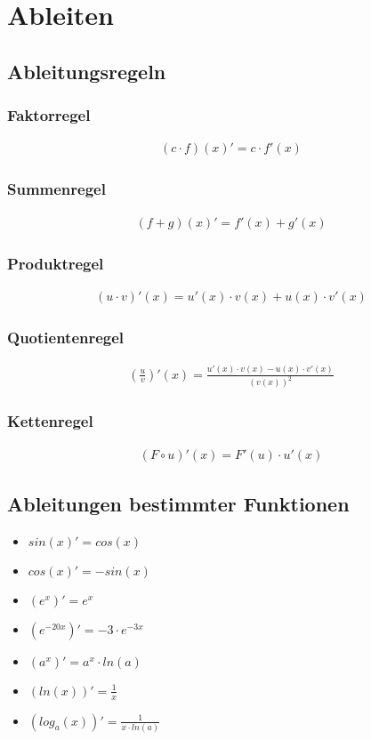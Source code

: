 \section{Ableiten}
\subsection{Ableitungsregeln}
\subsubsection{Faktorregel}
\begin{align*}
    (c \cdot f)(x)' = c \cdot f'(x)
\end{align*}
\subsubsection{Summenregel}
\begin{align*}
    (f+ g)(x)' = f'(x) + g'(x)
\end{align*}
\subsubsection{Produktregel}
\begin{align*}
    (u \cdot v)'(x) = u'(x) \cdot v(x) + u(x) \cdot v'(x)
\end{align*}
\subsubsection{Quotientenregel}
\begin{align*}
    \left(\frac{u}{v}\right)'(x) = \frac{u'(x) \cdot v(x) - u(x) \cdot v'(x)}{(v(x))^2}
\end{align*}
\subsubsection{Kettenregel}
\begin{align*}
    (F \circ u)'(x) = F'(u) \cdot u'(x)
\end{align*}
\subsection{Ableitungen bestimmter Funktionen}
\begin{itemize}
    \item $sin(x)' = cos(x)$
    \item $cos(x)' = -sin(x)$
    \item $(e^x)' = e^x$
    \item $(e^{-20x})' = -3 \cdot e^{-3x}$
    \item $(a^x)' = a^x \cdot ln(a)$
    \item $(ln(x))' = \frac{1}{x}$
    \item $(log_a(x))' = \frac{1}{x \cdot ln(a)}$
\end{itemize}
